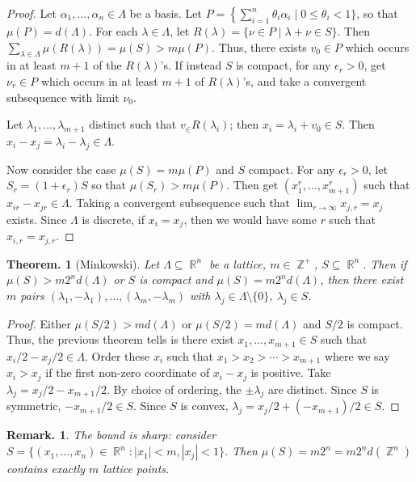 \documentclass[11pt, a4paper]{memoir}
\DeclareMathOperator{\Z}{{\mathbb{Z}}}
\DeclareMathOperator{\R}{{\mathbb{R}}}
\theoremstyle{change}
\newtheorem{theorem}{Theorem.}[section]
\theoremstyle{plain}
\theoremstyle{nonumberplain}
\newtheorem{remark}{Remark.}
\newtheorem{proof}{Proof}
\begin{document}
\begin{proof}
    Let $\alpha_1,\ldots,\alpha_n\in\Lambda$ be a basis.
    Let $P=\left\{\sum_{i=1}^n\theta_i\alpha_i\mid 0\leq\theta_i<1\}$, so that $\mu(P)=d(\Lambda)$.
    For each $\lambda\in\Lambda$, let $R(\lambda)=\{\nu\in P\mid\lambda+\nu\in S\}$.
    Then $\sum_{\lambda\in\Lambda}\mu(R(\lambda))=\mu(S)>m\mu(P)$.
    Thus, there exists $v_0\in P$ which occurs in at least $m+1$ of the $R(\lambda)$'s.
    If instead $S$ is compact, for any $\epsilon_r>0$, get $\nu_r\in P$ which occurs in at least $m+1$ of $R(\lambda)$'s, and take a convergent subsequence with limit $\nu_0$.

    Let $\lambda_1,\ldots,\lambda_{m+1}$ distinct such that $v_\in R(\lambda_i)$; then $x_i=\lambda_i+v_0\in S$.
    Then $x_i-x_j=\lambda_i-\lambda_j\in\Lambda$.

    Now consider the case $\mu(S)=m\mu(P)$ and $S$ compact.
    For any $\epsilon_r>0$, let $S_r=(1+\epsilon_r)S$ so that $\mu(S_r)>m\mu(P)$.
    Then get $(x_1^r,\ldots,x_{m+1}^r)$ such that $x_{ir}-x_{jr}\in\Lambda$.
    Taking a convergent subsequence such that $\lim_{r\to\infty}x_{j,r}=x_j$ exists.
    Since $\Lambda$ is discrete, if $x_i=x_j$, then we would have some $r$ such that $x_{i,r}=x_{j,r}$.
\end{proof}
\begin{theorem}[Minkowski]
    Let $\Lambda\subseteq\R^n$ be a lattice, $m\in\Z^+$, $S\subseteq\R^n$.
    Then if $\mu(S)>m2^nd(\Lambda)$ or $S$ is compact and $\mu(S)=m2^nd(\Lambda)$, then there exist $m$ pairs $(\lambda_1,-\lambda_1),\ldots,(\lambda_m,-\lambda_m)$ with $\lambda_j\in\Lambda\setminus\{0\}$, $\lambda_j\in S$.
\end{theorem}
\begin{proof}
    Either $\mu(S/2)>md(\Lambda)$ or $\mu(S/2)=md(\Lambda)$ and $S/2$ is compact.
    Thus, the previous theorem tells is there exist $x_1,\ldots,x_{m+1}\in S$ such that $x_i/2-x_j/2\in\Lambda$.
    Order these $x_i$ such that $x_1>x_2>\cdots>x_{m+1}$ where we say $x_i>x_j$ if the first non-zero coordinate of $x_i-x_j$ is positive.
    Take $\lambda_j=x_j/2-x_{m+1}/2$.
    By choice of ordering, the $\pm\lambda_j$ are distinct.
    Since $S$ is symmetric, $-x_{m+1}/2\in S$.
    Since $S$ is convex, $\lambda_j=x_j/2+(-x_{m+1})/2\in S$.
\end{proof}
\begin{remark}
    The bound is sharp: consider $S=\{(x_1,\ldots,x_n)\in\R^n:|x_1|<m,|x_j|<1\}$.
    Then $\mu(S)=m2^n=m2^nd(\Z^n)$ contains exactly $m$ lattice points.
\end{remark}
\end{document}
